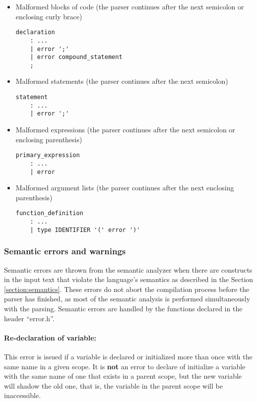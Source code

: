 \begin{itemize}
\item  Malformed blocks of code (the parser continues after the next semicolon or enclosing
curly brace)
\begin{lstlisting}
declaration
	: ...
	| error ';'
	| error compound_statement
	;

\end{lstlisting}

\item  Malformed statements (the parser continues after the next semicolon)
\begin{lstlisting}
statement
	: ...
	| error ';'
\end{lstlisting}

\item  Malformed expressions (the parser continues after the next semicolon or enclosing
parenthesis)
\begin{lstlisting}
primary_expression
	: ...
	| error
\end{lstlisting}

\item  Malformed argument lists (the parser continues after the next enclosing parenthesis)
\begin{lstlisting}
function_definition
	: ...
	| type IDENTIFIER '(' error ')'
\end{lstlisting}
\end{itemize}


\subsubsection{Semantic errors and warnings}
Semantic errors are thrown from the semantic analyzer when there are constructs
in the input text that violate the language's semantics as described in the Section
\ref{section:semantics}. These errors do not abort the compilation process before
the parser has finished, as most of the semantic analysis is performed
simultaneously with the parsing. Semantic errors are handled by the functions
declared in the header ``error.h''.

\paragraph{Re-declaration of variable:} This error is issued if a variable is
declared or initialized more than once with the same name in a given scope.
It is \textbf{not} an error to declare of initialize a variable with the same
name of one that exists in a parent scope, but the new variable will shadow the
old one, that is, the variable in the parent scope will be inaccessible. %

